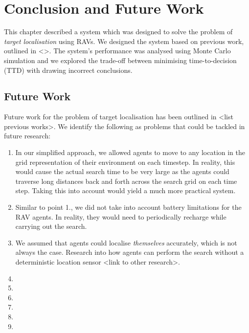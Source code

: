 \section{Conclusion and Future Work}


This chapter described a system which was designed to solve the problem of \textit{target localisation} using RAVs. We designed the system based on previous work, outlined in <>. The system's performance was analysed using Monte Carlo simulation and we explored the trade-off between minimising time-to-decision (TTD) with drawing incorrect conclusions. 

\subsection{Future Work}
Future work for the problem of target localisation has been outlined in <list previous works>. We identify the following as problems that could be tackled in future research:

\begin{enumerate}
    \item In our simplified approach, we allowed agents to move to any location in the grid representation of their environment on each timestep. In reality, this would cause the actual search time to be very large as the agents could traverse long distances back and forth across the search grid on each time step. Taking this into account would yield a much more practical system.
    \item Similar to point 1., we did not take into account battery limitations for the RAV agents. In reality, they would need to periodically recharge while carrying out the search. 
    \item We assumed that agents could localise \textit{themselves} accurately, which is not always the case. Research into how agents can perform the search without a deterministic location sensor <link to other research>.
    \item 
    \item 
    \item 
    \item 
    \item 
    \item 
\end{enumerate}